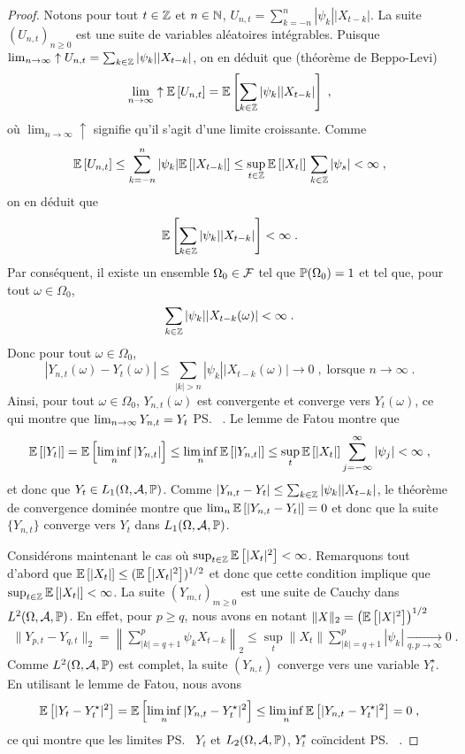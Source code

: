 \begin{proof}
Notons pour tout $t \in \mathbb{Z}$ et $n \in \mathbb{N}$, $U_{n,t} = \sum_{k=-n}^{n} |\psi_k| |X_{t-k}|$. La suite
$(U_{n,t})_{n \geq 0}$ est une suite de variables al\'eatoires int\'egrables. Puisque $\lim_{n \rightarrow \infty} \uparrow U_{n,t} = \sum_{k\in\mathbb{Z}}|\psi_k| |X_{t-k}|$, on en d\'eduit que (th\'eor\`eme de Beppo-Levi)
$$
\lim_{n \to \infty} \uparrow {\mathbb E}\left[ U_{n,t} \right] = {\mathbb E}\left[ \sum_{k\in\mathbb{Z}}|\psi_k| |X_{t-k}| \right]\;,
$$
o\`u $\lim_{n \to \infty} \uparrow$ signifie qu'il s'agit d'une limite croissante.
Comme
$$
{\mathbb E}\left[ U_{n,t} \right]\leq \sum_{k=-n}^{n} |\psi_k| {\mathbb E}\left[ |X_{t-k}| \right] \leq \sup_{t \in \mathbb{Z}} {\mathbb E}\left[ |X_t| \right] \, \sum_{k\in\mathbb{Z}} |\psi_s|
<\infty\;,
$$
on en d\'eduit que
\[
{\mathbb E}\left[ \sum_{k\in\mathbb{Z}} |\psi_k| |X_{t-k}|  \right]< \infty \;.
\]
Par cons\'equent, il existe un ensemble $\Omega_0 \in \mathcal{F}$ tel que $\mathbb{P}(\Omega_0) = 1$
et tel que, pour tout $\omega \in \Omega_0$,
\[
\sum_{k\in\mathbb{Z}} |\psi_k| | X_{t-k}(\omega) | < \infty\; .
\]
Donc pour tout $\omega \in \Omega_0$,
$$
|Y_{n,t}(\omega)-Y_t(\omega)|\leq\sum_{|k|>n}|\psi_k||X_{t-k}(\omega)|\to 0\;,\;
\textrm{lorsque } n\to\infty\;.
$$
Ainsi, pour tout $\omega \in \Omega_0$, $Y_{n,t}(\omega)$ est convergente et converge vers
$Y_t(\omega)$, ce qui montre que $\lim_{n \rightarrow \infty} Y_{n,t}= Y_t$ \ps\ . Le lemme de Fatou montre que
\[
{\mathbb E}\left[ |Y_t| \right]= {\mathbb E}\left[ \liminf_n |Y_{n,t}| \right] \leq \liminf_n {\mathbb E}\left[ |Y_{n,t}| \right] \leq \sup_t {\mathbb E}\left[ |X_t| \right] \sum_{j=-\infty}^\infty |\psi_j| < \infty \;,
\]
et donc que $Y_t \in L_1(\Omega,\mathcal{A},\mathbb{P})$. Comme $|Y_{n,t} - Y_t| \leq \sum_{k \in \mathbb{Z}} |\psi_k| |X_{t-k}|$,
le th\'eor\`eme de convergence domin\'ee montre que $\lim_n {\mathbb E}\left[ |Y_{n,t}-Y_t| \right] = 0$ et donc que la suite
$\{ Y_{n,t} \}$ converge vers $Y_t$ dans $L_1(\Omega,\mathcal{A},\mathbb{P})$.

Consid\'erons maintenant le cas o\`u $\sup_{t \in \mathbb{Z}}
{\mathbb E}\left[ |X_{t}|^2 \right] < \infty$. Remarquons tout d'abord que ${\mathbb E}\left[ 
|X_{t}| \right] \leq ({\mathbb E}\left[ |X_{t}|^2 \right])^{1/2}$ et donc que cette condition
implique que $\sup_{t \in \mathbb{Z}} {\mathbb E}\left[ |X_{t}| \right] < \infty$. La
suite $(Y_{m,t})_{m\geq 0}$ est une suite de Cauchy dans
$L^2(\Omega,\mathcal{A},\mathbb{P})$. En effet, pour $p \geq q$,
nous avons en notant $\| X \|_2 = \left( {\mathbb E}\left[ |X|^2 \right] \right)^{1/2}$
\begin{multline*}
\|Y_{p,t} - Y_{q,t} \|_2 = \left\| \sum_{|k|=q+1}^p \psi_k X_{t-k} \right\|_2
\leq \sup_t \|X_t\| \sum_{|k|=q+1}^p |\psi_k|  \underset{q,p \rightarrow \infty}{\longrightarrow} 0\;.
\end{multline*}
Comme $L^2(\Omega,\mathcal{A},\mathbb{P})$ est complet, la suite $(Y_{n,t})$ converge vers une variable $Y_t^\star$.
En utilisant le lemme de Fatou, nous avons
\[
{\mathbb E}\left[ |Y_t - Y_t^\star|^2 \right] = {\mathbb E}\left[ \liminf_n |Y_{n,t} - Y_t^{\star}|^2 \right] \leq \liminf_n {\mathbb E}\left[ |Y_{n,t}- Y_t^{\star}|^2 \right]= 0 \;,
\]
ce qui montre que les limites \ps\ $Y_t$ et $L_2(\Omega,\mathcal{A},\mathbb{P})$, $Y_t^\star$ co\"{i}ncident \ps\ .

\end{proof}


